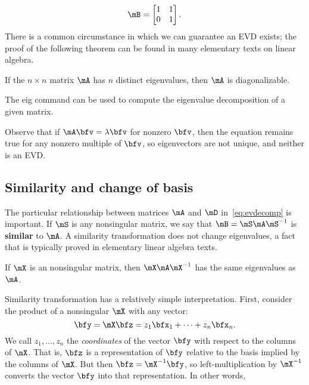 \begin{equation}
  \label{eq:jordanblock}
  \mB = \begin{bmatrix}
    1 & 1\\0 & 1
  \end{bmatrix}.
\end{equation}
There is a common circumstance in which we can guarantee an EVD exists; the proof of the following theorem can be found in many elementary texts on linear algebra.
\begin{thm}
  If the $n\times n$ matrix $\mA$ has $n$ distinct eigenvalues, then $\mA$
  is diagonalizable.
\end{thm}

The \gls{eig} command can be used to compute the eigenvalue decomposition of a given matrix.

\begin{exam}
\end{exam}

Observe that if $\mA\bfv = \lambda \bfv$ for nonzero $\bfv$, then the equation remains true for any nonzero multiple of $\bfv$, so eigenvectors are not unique, and neither is an EVD.



\subsection{Similarity and change of basis}

The particular relationship between matrices $\mA$ and $\mD$ in~\eqref{eq:evdecomp} is important.  If $\mS$ is any nonsingular matrix, we say that $\mB=\mS\mA\mS^{-1}$ is  \textbf{similar} to $\mA$. A similarity transformation does not change eigenvalues, a fact that is typically proved in elementary linear algebra texts.
\begin{thm}
  If $\mX$ is an nonsingular matrix, then $\mX\mA\mX^{-1}$ has the same
  eigenvalues as $\mA$.
\end{thm}

Similarity transformation has a relatively simple interpretation. First, consider the product of a nonsingular $\mX$ with any vector:
\begin{equation*}
  \bfy = \mX \bfz = z_1 \bfx_1 +  \dots + z_n \bfx_n.
\end{equation*}
We call $z_1,\ldots,z_n$ the \emph{coordinates} of the vector $\bfy$ with respect to the columns of $\mX$. That is, $\bfz$ is a representation of $\bfy$ relative to the basis implied by the columns of $\mX$. But then $\bfz = \mX^{-1} \bfy$, so left-multiplication by $\mX^{-1}$ converts the vector $\bfy$ into that representation. In other words, 

